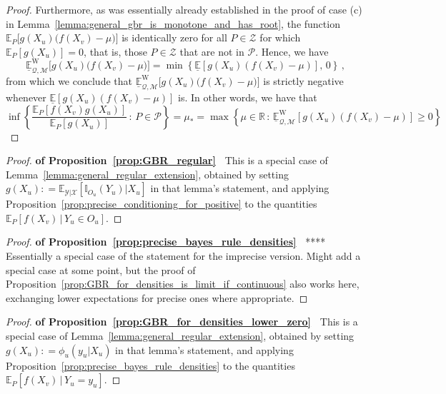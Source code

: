 \documentclass[twoside,11pt]{article}
\newcommand{\reals}{\mathbb{R}}
\newcommand{\states}{\mathcal{X}}
\newcommand{\observs}{\mathcal{Y}}
\newcommand{\lexp}{\underline{\mathbb{E}}_{\rateset,\mathcal{M}}^\mathrm{W}}
\newcommand{\ind}[1]{\mathbb{I}_{#1}}
\newcommand{\rateset}{\mathcal{Q}}
\newcommand{\coloneqq}{:\!=}
\begin{document}
\begin{proof}
Furthermore, as was essentially already established in the proof of case (c) in Lemma~\ref{lemma:general_gbr_is_monotone_and_has_root}, the function $\mathbb{E}_P\bigl[g(X_u)\bigl(f(X_v)-\mu\bigr)\bigr]$ is identically zero for all $P\in\mathcal{Z}$ for which $\mathbb{E}_P[g(X_u)]=0$, that is, those $P\in\mathcal{Z}$ that are not in $\mathcal{P}$. Hence, we have 
\begin{equation*}
\lexp\bigl[g(X_u)\bigl(f(X_v)-\mu\bigr)\bigr] = \min\left\{\underline{\mathbb{E}}[g(X_u)(f(X_v) - \mu)],\,0 \right\}\,,
\end{equation*}
from which we conclude that $\lexp\bigl[g(X_u)\bigl(f(X_v)-\mu\bigr)\bigr]$ is strictly negative whenever $\underline{\mathbb{E}}[g(X_u)(f(X_v) - \mu)]$ is. In other words, we have that
\begin{equation*}
\inf\left\{\frac{\mathbb{E}_P[f(X_v)g(X_u)]}{\mathbb{E}_P[g(X_u)]}\,:\,P\in\mathcal{P}\right\} = \mu_* = \max\left\{ \mu\in\reals\,:\, \lexp[g(X_u)(f(X_v) - \mu)] \geq 0 \right\}
\end{equation*}
\end{proof}

\begin{proof}{\bf of Proposition~\ref{prop:GBR_regular}~}
This is a special case of Lemma~\ref{lemma:general_regular_extension}, obtained by setting $g(X_u)\coloneqq \mathbb{E}_{\observs\vert\states}[\ind{O_u}(Y_u)\vert X_u]$ in that lemma's statement, and applying Proposition~\ref{prop:precise_conditioning_for_positive} to the quantities $\mathbb{E}_P[f(X_v)\,\vert\,Y_u\in O_u]$.
\end{proof}

\begin{proof}{\bf of Proposition~\ref{prop:precise_bayes_rule_densities}~}
**** Essentially a special case of the statement for the imprecise version. Might add a special case at some point, but the proof of Proposition~\ref{prop:GBR_for_densities_is_limit_if_continuous} also works here, exchanging lower expectations for precise ones where appropriate.
\end{proof}

\begin{proof}{\bf of Proposition~\ref{prop:GBR_for_densities_lower_zero}~}
This is a special case of Lemma~\ref{lemma:general_regular_extension}, obtained by setting $g(X_u)\coloneqq \phi_u(y_u\vert X_u)$ in that lemma's statement, and applying Proposition~\ref{prop:precise_bayes_rule_densities} to the quantities $\mathbb{E}_P[f(X_v)\,\vert\,Y_u=y_u]$.
\end{proof}
\end{document}
